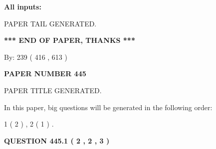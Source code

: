 \documentclass[12pt]{article}
\begin{document}
   
   
   
\noindent{}
   
   
   
   
\noindent\vspace{0.1in}\hspace{-0.08in} {\textbf{\Large{All inputs: }}}
   
   
   
   
   
   
 \vspace{0.2in}
 
   
   
\vspace{2.0in} PAPER TAIL GENERATED.
   
   
   
   
\vspace{1.0in} 
{\textbf{\large{ *** END OF PAPER, THANKS *** }}} 
   
   
\hspace{1.0in} By: 
 239 ( 416 ,  613 )
   
   
   
   
\newpage 
\setcounter{page}{ 
   445001 } 
   
   
   
   
 {\textbf{ \Large{ PAPER NUMBER  445  }}}
   
   
\vspace{0.2in}
   
   
   
   
   
   
   
   
 \vspace{0.2in}
 
 
 
 
   
   
 PAPER TITLE GENERATED.
   
   
   
\vspace{0.2in}
   
In this paper, big questions will be generated in the following order: 
   
   
   1 ( 2 )
 ,
   2 ( 1 )
 .
  
\vspace{0.2in}
  
{\textbf{\Large{QUESTION
445.1 
 ( 2 , 2 , 3 )
}}}
  
\end{document}
